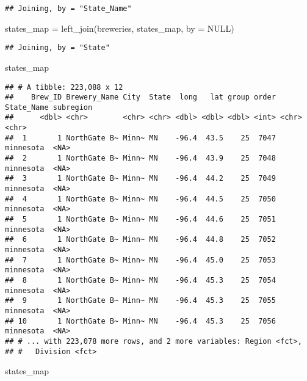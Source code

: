 \documentclass[
]{article}
\newenvironment{Shaded}{\begin{snugshade}}{\end{snugshade}}
\newcommand{\AttributeTok}[1]{\textcolor[rgb]{0.77,0.63,0.00}{#1}}
\newcommand{\ConstantTok}[1]{\textcolor[rgb]{0.00,0.00,0.00}{#1}}
\newcommand{\FunctionTok}[1]{\textcolor[rgb]{0.00,0.00,0.00}{#1}}
\newcommand{\NormalTok}[1]{#1}
\newcommand{\OtherTok}[1]{\textcolor[rgb]{0.56,0.35,0.01}{#1}}
\begin{document}
\begin{verbatim}
## Joining, by = "State_Name"
\end{verbatim}

\begin{Shaded}
\begin{Highlighting}[]
\NormalTok{states\_map }\OtherTok{=} \FunctionTok{left\_join}\NormalTok{(breweries, states\_map, }\AttributeTok{by =} \ConstantTok{NULL}\NormalTok{)}
\end{Highlighting}
\end{Shaded}

\begin{verbatim}
## Joining, by = "State"
\end{verbatim}

\begin{Shaded}
\begin{Highlighting}[]
\NormalTok{states\_map}
\end{Highlighting}
\end{Shaded}

\begin{verbatim}
## # A tibble: 223,088 x 12
##    Brew_ID Brewery_Name City  State  long   lat group order State_Name subregion
##      <dbl> <chr>        <chr> <chr> <dbl> <dbl> <dbl> <int> <chr>      <chr>    
##  1       1 NorthGate B~ Minn~ MN    -96.4  43.5    25  7047 minnesota  <NA>     
##  2       1 NorthGate B~ Minn~ MN    -96.4  43.9    25  7048 minnesota  <NA>     
##  3       1 NorthGate B~ Minn~ MN    -96.4  44.2    25  7049 minnesota  <NA>     
##  4       1 NorthGate B~ Minn~ MN    -96.4  44.5    25  7050 minnesota  <NA>     
##  5       1 NorthGate B~ Minn~ MN    -96.4  44.6    25  7051 minnesota  <NA>     
##  6       1 NorthGate B~ Minn~ MN    -96.4  44.8    25  7052 minnesota  <NA>     
##  7       1 NorthGate B~ Minn~ MN    -96.4  45.0    25  7053 minnesota  <NA>     
##  8       1 NorthGate B~ Minn~ MN    -96.4  45.3    25  7054 minnesota  <NA>     
##  9       1 NorthGate B~ Minn~ MN    -96.4  45.3    25  7055 minnesota  <NA>     
## 10       1 NorthGate B~ Minn~ MN    -96.4  45.3    25  7056 minnesota  <NA>     
## # ... with 223,078 more rows, and 2 more variables: Region <fct>,
## #   Division <fct>
\end{verbatim}

\begin{Shaded}
\begin{Highlighting}[]
\NormalTok{states\_map}
\end{Highlighting}
\end{Shaded}
\end{document}
